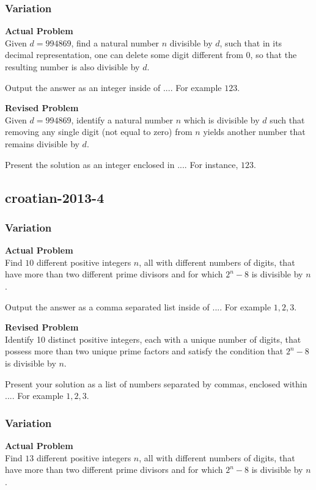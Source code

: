 \subsubsection{Variation}
\textbf{Actual Problem}\\
Given $d = 994869$, find a natural number $n$ divisible by $d$, such that in its decimal representation, one can delete some digit different from $0$, so that the resulting number is also divisible by $d$.

Output the answer as an integer inside of $\boxed{...}$. For example $\boxed{123}$.

\textbf{Revised Problem}\\
Given \( d = 994869 \), identify a natural number \( n \) which is divisible by \( d \) such that removing any single digit (not equal to zero) from \( n \) yields another number that remains divisible by \( d \).

Present the solution as an integer enclosed in \(\boxed{...}\). For instance, \(\boxed{123}\).

\subsection{croatian-2013-4}
\subsubsection{Variation}
\textbf{Actual Problem}\\
Find $10$ different positive integers $n$, all with different numbers of digits, that have more than two different prime divisors and for which $2^n - 8$ is divisible by $n$.

Output the answer as a comma separated list inside of $\boxed{...}$. For example $\boxed{1, 2, 3}$.

\textbf{Revised Problem}\\
Identify 10 distinct positive integers, each with a unique number of digits, that possess more than two unique prime factors and satisfy the condition that \( 2^n - 8 \) is divisible by \( n \).

Present your solution as a list of numbers separated by commas, enclosed within \(\boxed{...}\). For example \(\boxed{1, 2, 3}\).

\subsubsection{Variation}
\textbf{Actual Problem}\\
Find $13$ different positive integers $n$, all with different numbers of digits, that have more than two different prime divisors and for which $2^n - 8$ is divisible by $n$.


